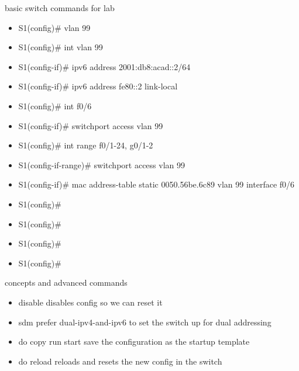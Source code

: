 
\hspace{0.2cm}
\begin{tcolorbox}[width=6.3in]
\scriptsize 
basic switch commands for lab
\begin{itemize}
  \item{S1(config)#} vlan 99 

  \item{S1(config)#} int vlan 99
  \item{S1(config-if)#} ipv6 address 2001:db8:acad::2/64
  \item{S1(config-if)#} ipv6 address fe80::2 link-local

  \item{S1(config)#} int f0/6
  \item{S1(config-if)#} switchport access vlan 99

  \item{S1(config)#} int range f0/1-24, g0/1-2
  \item{S1(config-if-range)#} switchport access vlan 99

  \item{S1(config-if)#} mac address-table static 0050.56be.6c89 vlan 99
    interface f0/6

  \item{S1(config)#} 
  \item{S1(config)#} 
  \item{S1(config)#} 
  \item{S1(config)#} 
\end{itemize}
concepts and advanced commands
\begin{itemize}
  \item{disable} disables config so we can reset it
  \item{sdm prefer dual-ipv4-and-ipv6} to set the switch up for dual addressing 
  \item{do copy run start} save the configuration as the startup template 
  \item{do reload} reloads and resets the new config in the switch
\end{itemize} 
\end{tcolorbox}
\hspace{0.2cm}
\normalsize  

